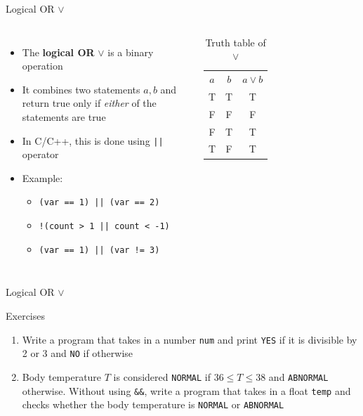 \documentclass[10pt,xcolor={table,dvipsnames},t]{beamer}
\begin{document}
\begin{frame}{Logical OR $\lor$}
  \begin{columns}
    \begin{itemize}
      \item The \textbf{logical OR} $\lor$ is a binary operation
      \item It combines two statements $a,b$ and return true only if \textit{either} of the statements are true 
      \item In C/C++, this is done using \texttt{||} operator
      \item Example:
      \begin{itemize}
        \item \texttt{(var == 1) || (var == 2)}
        \item \texttt{!(count > 1 || count < -1)}
        \item \texttt{(var == 1) || (var != 3)}
      \end{itemize}
    \end{itemize}
    \begin{table}[]
      \begin{tabular}{ccc}
      $a$ & $b$ & $a\lor b$  \\
      T & T & T \\
      F & F & F \\
      F & T & T\\
      T & F & T
      \end{tabular}
      \caption{Truth table of $\lor$}
      \end{table}
  \end{columns}
\end{frame}

\begin{frame}{Logical OR $\lor$}
  \begin{exampleblock}{Exercises}
    \begin{enumerate}
      \item Write a program that takes in a number \texttt{num} and print \texttt{YES} if it is divisible by 2 or 3 and \texttt{NO} if otherwise
      \item Body temperature $T$ is considered \texttt{NORMAL} if $36\leq T \leq 38$ and \texttt{ABNORMAL} otherwise. Without using \texttt{\&\&}, write a program that takes in a float \texttt{temp} and checks whether the body temperature is \texttt{NORMAL} or \texttt{ABNORMAL}
    \end{enumerate}
  \end{exampleblock}
\end{frame}
\end{document}
